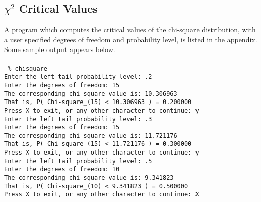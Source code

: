 \documentclass{article}
\begin{document}
\subsection{$\chi^2$ Critical Values}
\label{sec:chi}
A program which computes the critical values of the chi-square
distribution, with a user specified degrees of freedom and 
probability level, is listed in the appendix.  Some sample 
output appears below.\\
\\
{\tt 
\% chisquare\\
 
Enter the left tail probability level: .2\\
 
Enter the degrees of freedom: 15\\
 
The corresponding chi-square value is: 10.306963\\
 
That is, P( Chi-square\_(15) < 10.306963 ) = 0.200000\\
 
Press X to exit, or any other character to continue: y\\
 
Enter the left tail probability level: .3\\
 
Enter the degrees of freedom: 15\\
 
The corresponding chi-square value is: 11.721176\\
 
That is, P( Chi-square\_(15) < 11.721176 ) = 0.300000\\
 
Press X to exit, or any other character to continue: y\\
 
Enter the left tail probability level: .5\\
 
Enter the degrees of freedom: 10\\
 
The corresponding chi-square value is: 9.341823\\
 
That is, P( Chi-square\_(10) < 9.341823 ) = 0.500000\\
 
Press X to exit, or any other character to continue: X\\
\\
}
\end{document}

